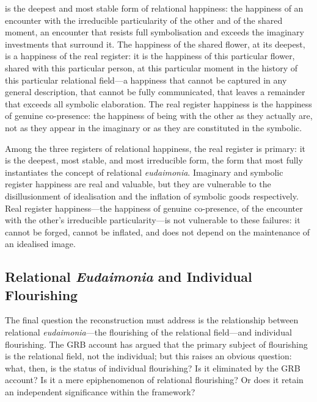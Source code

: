  is the deepest and most stable form of relational happiness: the happiness of an encounter with the irreducible particularity of the other and of the shared moment, an encounter that resists full symbolisation and exceeds the imaginary investments that surround it. The happiness of the shared flower, at its deepest, is a happiness of the real register: it is the happiness of this particular flower, shared with this particular person, at this particular moment in the history of this particular relational field---a happiness that cannot be captured in any general description, that cannot be fully communicated, that leaves a remainder that exceeds all symbolic elaboration. The real register happiness is the happiness of genuine co-presence: the happiness of being with the other as they actually are, not as they appear in the imaginary or as they are constituted in the symbolic.

\begin{claim}
Among the three registers of relational happiness, the real register is primary: it is the deepest, most stable, and most irreducible form, the form that most fully instantiates the concept of relational \emph{eudaimonia}. Imaginary and symbolic register happiness are real and valuable, but they are vulnerable to the disillusionment of idealisation and the inflation of symbolic goods respectively. Real register happiness---the happiness of genuine co-presence, of the encounter with the other's irreducible particularity---is not vulnerable to these failures: it cannot be forged, cannot be inflated, and does not depend on the maintenance of an idealised image.
\end{claim}

\subsection{Relational \emph{Eudaimonia} and Individual Flourishing}
\label{p14:subsec:relindiv}

\noindent
The final question the reconstruction must address is the relationship between relational \emph{eudaimonia}---the flourishing of the relational field---and individual flourishing. The GRB account has argued that the primary subject of flourishing is the relational field, not the individual; but this raises an obvious question: what, then, is the status of individual flourishing? Is it eliminated by the GRB account? Is it a mere epiphenomenon of relational flourishing? Or does it retain an independent significance within the framework?

